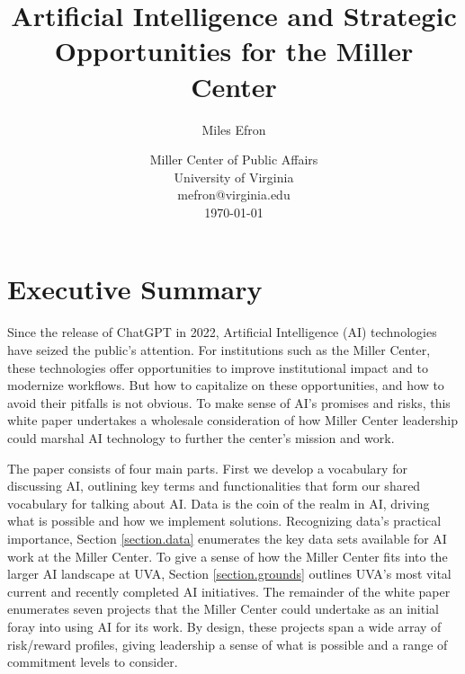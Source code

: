 \documentclass[12pt, oneside]{article}   	%
\title{Artificial Intelligence and Strategic Opportunities for the Miller Center}
\author{Miles Efron}
\date{
 Miller Center of Public Affairs \\
 University of Virginia \\
 mefron@virginia.edu \\
 \bigskip
 \today
}							%
\begin{document}
\maketitle


\pagebreak
\tableofcontents
\pagebreak


\section{Executive Summary}\label{section.summary}
Since the release of ChatGPT in 2022, Artificial Intelligence (AI) technologies have seized the public’s attention.  For institutions such as the Miller Center, these technologies offer opportunities to improve institutional impact and to modernize workflows. But how to capitalize on these opportunities, and how to avoid their  pitfalls is not obvious.  To make sense of AI’s promises and risks, this white paper undertakes a wholesale consideration of how Miller Center leadership could marshal AI technology  to further the center’s mission and work.  

The paper consists of four main parts.  First we develop a  vocabulary for discussing AI, outlining key terms and functionalities that form our shared vocabulary for talking about AI.  Data is the coin of the realm in AI, driving what is possible and how we  implement solutions.  Recognizing data's practical importance, Section \ref{section.data} enumerates the key data sets available for AI work at the Miller Center.  To give a sense of how the Miller Center fits into the larger AI landscape at UVA, Section \ref{section.grounds} outlines UVA's most vital current and recently completed AI initiatives.  The remainder of the white paper enumerates seven projects that the Miller Center could undertake as an initial foray into using AI for its work.  By design, these projects span a wide array of risk/reward profiles, giving leadership a sense of what is possible and a range of commitment levels to consider.
\end{document}
